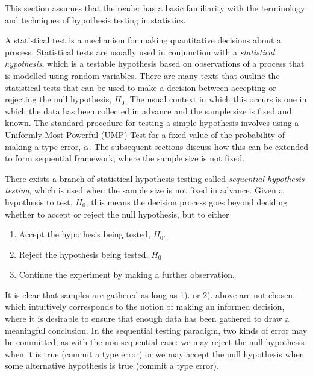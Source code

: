 
This section assumes that the reader has a basic familiarity with the terminology and techniques of hypothesis testing in statistics. 

A statistical test is a mechanism for making quantitative decisions about a process. Statistical tests are usually used in conjunction with a \textit{statistical hypothesis}, which is a testable hypothesis based on observations of a process that is modelled using random variables. There are many texts that outline the statistical tests that can be used to make a decision between accepting or rejecting the null hypothesis, $H_0$.  The usual context in which this occurs is one in which the data has been collected in advance and the sample size is fixed and known. The standard procedure for testing a simple hypothesis involves using a Uniformly Most Powerful (UMP) Test for a fixed value of the probability of making a type  error, $\alpha$. The subsequent sections discuss how this can be extended to form sequential framework, where the sample size is not fixed. \par

There exists a branch of statistical hypothesis testing called \textit{sequential hypothesis testing}, which is used when the sample size is not fixed in advance. Given a hypothesis to test, $H_0$, this means the decision process goes beyond deciding whether to accept or reject the null hypothesis, but to either
\begin{enumerate}
    \item Accept the hypothesis being tested, $H_0$.
    \item Reject the hypothesis being tested, $H_0$
    \item Continue the experiment by making a further observation.
\end{enumerate}

It is clear that samples are gathered as long as 1). or 2). above are not chosen, which intuitively corresponds to the notion of making an informed decision, where it is desirable to ensure that enough data has been gathered to draw a meaningful conclusion. In the sequential testing paradigm, two kinds of error may be committed, as with the non-sequential case: we may reject the null hypothesis when it is true (commit a type  error) or we may accept the null hypothesis when some alternative hypothesis is true (commit a type  error). 

